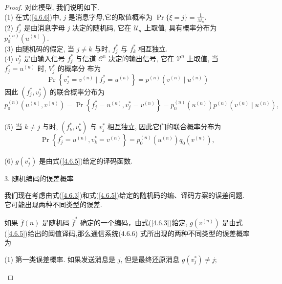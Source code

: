 \begin{proof}
对此模型, 我们说明如下.\\
(1) 在式(\ref{4.6.6})中, $ j $ 是消息字母,它的取值概率为 $ \operatorname{Pr}\{\tilde{\xi}=j\}=\frac{1}{M_{n}} $.\\
(2) $ f_{j}^{*} $ 是由消息字母 $ j $ 决定的随机码, 它在 $ \mathscr{U}_{n} $ 上取值, 具有概率分布为 $ p_{0}^{(n)}\left(u^{(n)}\right) $.\\
(3) 由随机码的假定, 当 $ j \neq k $ 与时, $ f_{j}^{*} $ 与 $ f_{k}^{*} $ 相互独立.\\
(4) $ v_{j}^{*} $ 是由输入信号 $ f_{j}^{*} $ 与信道 $ \mathscr{C}^{n} $ 决定的输出信号, 它在 $ \mathscr{V}^{n} $ 上取值, 当 $ f_{j}^{*}=u^{(n)} $ 时, $ V_{j}^{*} $ 的概率分 布为
$$
\operatorname{Pr}\left\{v_{j}^{*}=v^{(n)} \mid f_{j}^{*}=u^{(n)}\right\}=p^{(n)}\left(v^{(n)} \mid u^{(n)}\right)
$$
因此 $ \left(f_{j}^{*}, v_{j}^{*}\right) $ 的联合概率分布为
$$
p_{0}^{(n)}\left(u^{(n)}, v^{(n)}\right)=\operatorname{Pr}\left\{f_{j}^{*}=u^{(n)}, v_{j}^{*}=v^{(n)}\right\}=p_{0}^{(n)}\left(u^{(n)}\right) p^{(n)}\left(v^{(n)} \mid u^{(n)}\right),
$$\\
(5) 当 $ k \neq j $ 与时, $ \left(f_{k}^{*}, v_{k}^{*}\right) $ 与 $ v_{j}^{*} $ 相互独立, 因此它们的联合概率分布为
$$
\operatorname{Pr}\left\{f_{j}^{*}=u^{(n)}, v_{k}^{*}=v^{(n)}\right\}=p_{0}^{(n)}\left(u^{(n)}\right) q_{0}\left(v^{(n)}\right),
$$\\
(6) $ g\left(v_{j}^{*}\right) $ 是由式(\ref{4.6.5})给定的译码函数.

3. 随机编码的误差概率

我们现在考虑由式(\ref{4.6.3})和式(\ref{4.6.5})给定的随机码的编、译码方案的误差问题. 它可能出现两种不同类型的误差.
\begin{definition}
    如果 $ \bar{f}(n) $ 是随机码 $ \bar{f}^{*} $ 确定的一个编码，由式(\ref{4.6.3})給定, $ g\left(v^{(n)}\right) $ 是由式(\ref{4.6.5})给出的阈值译码,那么通信系统(4.6.6) 式所出现的两种不同类型的误差概率为
    
(1) 第一类误差概率. 如果发送消息是 $ j $, 但是最终还原消息 $ g\left(v_{j}^{*}\right) \neq j $;


\end{definition}
\end{proof}
